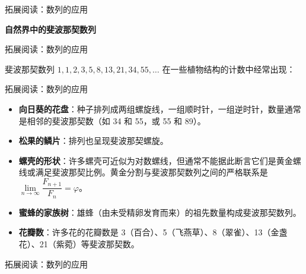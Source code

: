 \documentclass[aspectratio=169,10pt,fontset=fandol]{ctexbeamer}
\begin{document}
\begin{frame}[t,fragile]{拓展阅读：数列的应用}
\footnotesize
{\footnotesize
\textbf{自然界中的斐波那契数列}


}
\end{frame}
\begin{frame}[t,fragile]{拓展阅读：数列的应用}
\footnotesize
{\footnotesize
斐波那契数列 \(1, 1, 2, 3, 5, 8, 13, 21, 34, 55, \ldots\) 在一些植物结构的计数中经常出现：


}
\end{frame}
\begin{frame}[t,fragile]{拓展阅读：数列的应用}
\footnotesize
{\footnotesize
\begin{itemize}
\item \textbf{向日葵的花盘}：种子排列成两组螺旋线，一组顺时针，一组逆时针，数量通常是相邻的斐波那契数（如 34 和 55，或 55 和 89）。
\item \textbf{松果的鳞片}：排列也呈现斐波那契螺旋。
\item \textbf{螺壳的形状}：许多螺壳可近似为对数螺线，但通常不能据此断言它们是黄金螺线或满足斐波那契比例。黄金分割与斐波那契数列之间的严格联系是 \(\lim\limits_{n \to \infty} \dfrac{F_{n+1}}{F_n}=\varphi\)。
\item \textbf{蜜蜂的家族树}：雄蜂（由未受精卵发育而来）的祖先数量构成斐波那契数列。
\item \textbf{花瓣数}：许多花的花瓣数是 3（百合）、5（飞燕草）、8（翠雀）、13（金盏花）、21（紫菀）等斐波那契数。
\end{itemize}
}
\end{frame}
\begin{frame}[t,fragile]{拓展阅读：数列的应用}
\footnotesize
{\footnotesize
\begin{center}
\end{center}
}
\end{frame}
\end{document}
